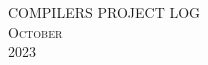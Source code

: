 \documentclass[10pt]{article} %
\begin{document}





\begin{center}

 \textsc{\LARGE COMPILERS PROJECT LOG}\\
	
 \textsc{\Large October}\\ %
	
 \textsc{\large 2023} %
\end{center}


\end{document}
